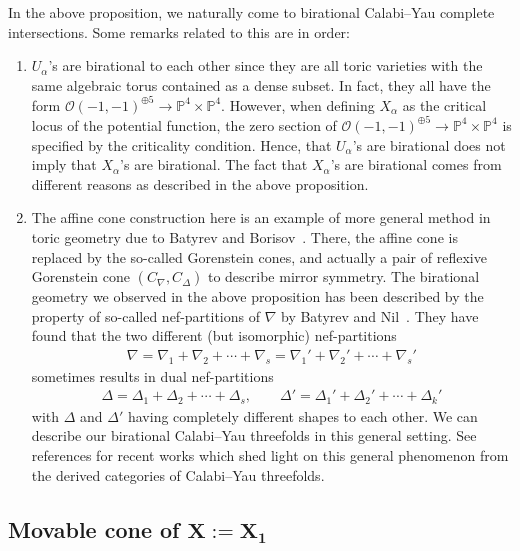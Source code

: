 \documentclass[10pt,a4paper]{amsart}
\numberwithin{equation}{section}
\begin{document}
\begin{Remark} \label{rem:Bat-Nil} In the above proposition, we naturally come to birational Calabi--Yau complete intersections. Some remarks related to this are in order:
\begin{enumerate}\itemsep=0pt
\item $U_{\alpha}$'s are birational to each other since they are all toric varieties with the same algebraic torus contained as a dense subset. In fact, they all have the form $\mathcal{O}(-1,-1)^{\oplus5}\to\mathbb{P}^{4}\times\mathbb{P}^{4}$. However, when defining $X_{\alpha}$ as the critical locus of the potential function, the zero section of $\mathcal{O}(-1,-1)^{\oplus5}\to\mathbb{P}^{4}\times\mathbb{P}^{4}$ is specified by the criticality condition. Hence, that $U_{\alpha}$'s are birational does not imply that $X_{\alpha}$'s are birational. The fact that $X_{\alpha}$'s are birational comes from different reasons as described in the above proposition.

\item The affine cone construction here is an example of more general method in toric geometry due to Batyrev and Borisov~\cite{BatBo}. There, the affine cone is replaced by the so-called Gorenstein cones, and actually a pair of reflexive Gorenstein cone $(C_{\nabla},C_{\Delta})$ to describe mirror symmetry. The birational geometry we observed in the above proposition has been described by the property of so-called nef-partitions of $\nabla$ by Batyrev and Nil~\cite{BatNil}. They have found that the two different (but isomorphic) nef-partitions
\begin{gather*}
\nabla=\nabla_{1}+\nabla_{2}+\cdots+\nabla_{s}=\nabla_{1}'+\nabla_{2}'+\cdots+\nabla_{s}'
\end{gather*}
sometimes results in dual nef-partitions
\begin{gather*}
\Delta=\Delta_{1}+\Delta_{2}+\cdots+\Delta_{s},\qquad \Delta'=\Delta_{1}'+\Delta_{2}'+\cdots+\Delta_{k}'
\end{gather*}
with $\Delta$ and $\Delta'$ having completely different shapes to each other. We can describe our birational Calabi--Yau threefolds in this general setting. See references \cite{BoLi, FavKel} for recent works which shed light on this general phenomenon from the derived categories of Calabi--Yau threefolds.
\end{enumerate}
\end{Remark}

\subsection[Movable cone of $X:=X_{1}$]{Movable cone of $\boldsymbol{X:=X_{1}}$} \label{sub:Movable-cone}
\end{document}

